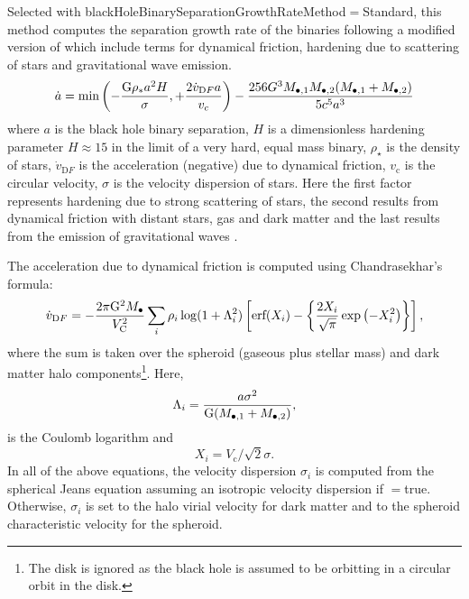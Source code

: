 Selected with {\normalfont \ttfamily blackHoleBinarySeparationGrowthRateMethod}$=${\normalfont \ttfamily Standard}, this method computes the separation growth rate of the binaries following a modified version of \cite {volonteri_assembly_2003} which include terms for dynamical friction, hardening due to scattering of stars and gravitational wave emission.
\begin{equation}
\dot{a} = \hbox{min} \left( - \frac{{\mathrm G}\rho _{*}a^2 H}{\sigma}, +\frac{2 \dot{v}_{\mathrm DF} a}{v_c} \right) - \frac{256 G^3 M_{\bullet, 1} M_{\bullet, 2} (M_{\bullet, 1} +M_{\bullet, 2})}{5 c^5 a^3}
\end{equation}
where $a$ is the black hole binary
separation, $H$ is a dimensionless hardening parameter $H\approx 15$ in the limit of 
a very hard, equal mass binary, $\rho _\star$ is the density of stars,
$\dot{v}_{\mathrm DF}$ is the acceleration (negative) due to dynamical friction,
$v_{\mathrm c}$ is the circular velocity, $\sigma$ is the velocity dispersion of stars. Here the first factor represents hardening due to strong scattering of stars, the second results from dynamical friction with distant stars, gas and dark matter and the last results from the emission of gravitational waves \cite{peters_gravitational_1964}.

The acceleration due to dynamical friction is computed using Chandrasekhar's formula:
\begin{equation}
 \dot{v}_{\mathrm DF}=- {2 \pi {\mathrm G}^2 M_\bullet \over V_{\mathrm C}^2} \sum_{i} \rho_i \log(1+\Lambda_i^2) \left[ \hbox{erf}(X_i)-\left\{ {2 X_i \over \sqrt{\pi}} \exp\left(-X_i^2\right) \right\} \right],
\end{equation}
where the sum is taken over the spheroid (gaseous plus stellar mass) and dark matter halo components\footnote{The disk is ignored as the black hole is assumed to be orbitting in a circular orbit in the disk.}. Here,
\begin{equation}
\Lambda_i =  {a \sigma^2  \over {\mathrm G}(M_{\bullet, 1}+M_{\bullet, 2})},
\end{equation}
is the Coulomb logarithm and
\begin{equation}
X_i = V_{\mathrm c} / \sqrt{2} \sigma.
\end{equation}
In all of the above equations, the velocity dispersion $\sigma_i$ is computed from the spherical Jeans equation assuming an isotropic velocity dispersion if {\normalfont \ttfamily [blackHoleBinariesComputeVelocityDispersion]}$=${\normalfont \ttfamily true}. Otherwise, $\sigma_i$ is set to the halo virial velocity for dark matter and to the spheroid characteristic velocity for the spheroid.

